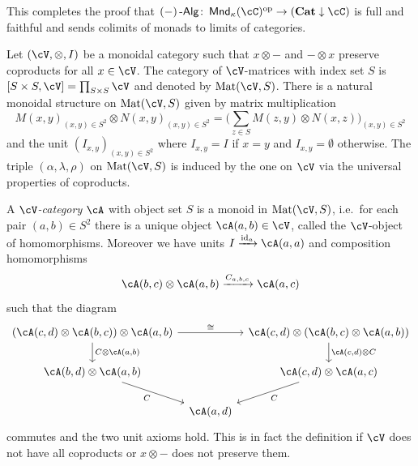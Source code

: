 \documentclass[a4paper,11pt,oneside,openany]{scrbook}
\begin{document}
\begin{rmk}
	This completes the proof that $ (-)\Alg \from \Mnd_\kappa(\cC)^{\text{op}} \to (\Cat\downarrow\cC)$ is full and faithful and sends colimits of monads to limits of categories.
\end{rmk}
Let $ (\cV,\otimes, I) $ be a monoidal category such that $ x\otimes - $ and $ -\otimes x $ preserve coproducts for all $ x\in\cV$.
The category of $\cV$-matrices with index set $ S $ is $ [S\times S,\cV] =\prod_{S\times S}\cV $ and denoted by $ \Mat(\cV ,     S) $. There is a natural monoidal structure on $ \Mat(\cV,S) $ given by matrix multiplication
\begin{displaymath}
	M(x,y)_{(x,y) \in S^2} \otimes N(x,y)_{(x,y) \in S^2} = \Big(\sum_{z\in S}
    M(z,y)\otimes N(x,z) \Big)_{(x,y)\in S^2}
\end{displaymath}
and the unit $ (I_{x,y})_{(x,y) \in S^2} $ where $ I_{x,y}= I $ if $ x = y $ and $ I_{x,y} = \emptyset $ otherwise.
The triple $ (\alpha,\lambda,\rho) $ on $ \Mat(\cV , S) $ is induced by the one on $\cV$ via the universal properties of coproducts.

\begin{defn}
	A $\cV$\emph{-category} $ \cA $ with object set $ S $ is a monoid in $
    \Mat(\cV,S) $, i.e.\ for each pair $ (a,b) \in S^2 $ there is a unique
    object $ \cA(a,b) \in\cV$, called the $\cV$-object of homomorphisms.
	Moreover we have units $ I\xrightarrow{\id_a} \cA(a,a) $ and composition homomorphisms
	\begin{displaymath}
		\cA(b,c) \otimes \cA(a,b) \xrightarrow{C_{a,b,c}} \cA(a,c)
	\end{displaymath}
	such that the diagram
	\begin{displaymath}
		\begin{tikzcd}[column sep=tiny]
			(\cA(c,d)\otimes \cA(b,c)) \otimes \cA(a,b)
			\arrow[d,"{C\otimes \cA(a,b)}"]\arrow[rr, "\cong"]
			&&
			\cA(c,d) \otimes (\cA(b,c) \otimes \cA(a,b) )
			\arrow[d,"{\cA(c,d)\otimes C}"]\\
			\cA(b,d)\otimes \cA(a,b)
			\arrow[rd, "C"']
			&&
			\cA(c,d)\otimes \cA(a,c)
			\arrow[ld, "C"]
			\\
			& \cA(a,d)
		\end{tikzcd}
	\end{displaymath}
	commutes and the two unit axioms hold.
	This is in fact the definition if $\cV$ does not have all coproducts or $ x\otimes - $ does not preserve them.
\end{defn}
\end{document}
